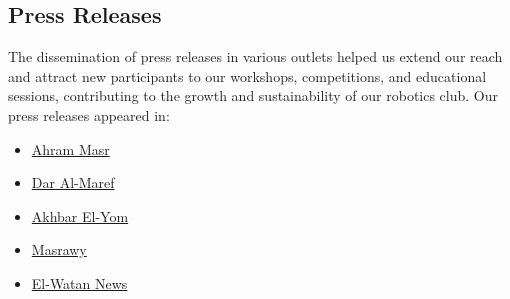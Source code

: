 \documentclass[11pt, twocolumn]{article}
\begin{document}
\subsection{Press Releases}
The dissemination of press releases in various outlets helped us extend our reach and attract new participants to our workshops, competitions, and educational sessions, contributing to the growth and sustainability of our robotics club.
Our press releases appeared in:
\begin{itemize}
    \item \href{https://rb.gy/maf8ra}{Ahram Masr}
    \item \href{https://daralmaref.com/News/1604649.aspx}{Dar Al-Maref}
    \item \href{https://rb.gy/n0l5f6}{Akhbar El-Yom}
    \item\href{https://www.elwatannews.com/news/details/7423221#goog_rewarded}{Masrawy}
    \item\href{https://www.elwatannews.com/news/details/7423221#goog_rewarded}{El-Watan News}
\end{itemize}
\end{document}
